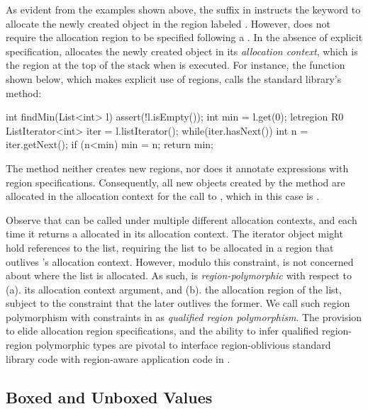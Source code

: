 As evident from the examples shown above, the suffix  in
 instructs the  keyword to allocate the newly created
object in the region labeled . However, \name does not require
the allocation region to be specified following a . In the
absence of explicit specification, \name allocates the newly created
object in its \emph{allocation context}, which is the region at the
top of the stack when  is executed. For instance, the
 function shown below, which makes explicit use of regions,
calls the standard  library's  method:
\begin{center}
\begin{codejava}
  int findMin(List<int> l) {
    assert(!l.isEmpty());
    int min = l.get(0);
    letregion R0 {
      ListIterator<int> iter = l.listIterator();
      while(iter.hasNext()) {
        int n = iter.getNext();
        if (n<min) min = n;
      }
    }
    return min;
  }
\end{codejava}
\end{center}
The  method neither creates new regions, nor does it
annotate  expressions with region specifications. Consequently,
all new objects created by the method are allocated in the allocation
context for the call to , which in this case is
. 

Observe that  can be called under multiple different
allocation contexts, and each time it returns a 
allocated in its allocation context. The iterator object might hold
references to the list, requiring the list to be allocated in a region
that outlives \!'s allocation context. However, modulo
this constraint,  is not concerned about where the
list is allocated. As such,  is
\emph{region-polymorphic} with respect to (a). its allocation context
argument, and (b). the allocation region of the list, subject to the
constraint that the later outlives the former. We call such region
polymorphism with constraints in \name as \emph{qualified region
polymorphism}. The provision to elide allocation region
specifications, and the ability to infer qualified region-region
polymorphic types are pivotal to interface region-oblivious standard
library code with region-aware application code in \name. 

\subsection{Boxed and Unboxed Values}

